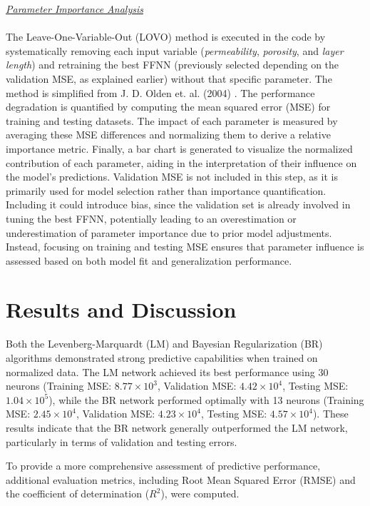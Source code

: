 \documentclass[10pt]{article}
\begin{document}
		\underline{\textit{Parameter Importance Analysis}} \\
		\\
		The Leave-One-Variable-Out (LOVO) method is executed in the code by systematically removing each input variable (\textit{permeability}, \textit{porosity}, and \textit{layer length}) and retraining the best FFNN (previously selected depending on the validation MSE, as explained earlier) without that specific parameter. The method is simplified from J. D. Olden et. al. (2004) \cite{olden2004}. The performance degradation is quantified by computing the mean squared error (MSE) for training and testing datasets. The impact of each parameter is measured by averaging these MSE differences and normalizing them to derive a relative importance metric. Finally, a bar chart is generated to visualize the normalized contribution of each parameter, aiding in the interpretation of their influence on the model's predictions. Validation MSE is not included in this step, as it is primarily used for model selection rather than importance quantification. Including it could introduce bias, since the validation set is already involved in tuning the best FFNN, potentially leading to an overestimation or underestimation of parameter importance due to prior model adjustments. Instead, focusing on training and testing MSE ensures that parameter influence is assessed based on both model fit and generalization performance.
	
	\section{Results and Discussion}
	
	Both the Levenberg-Marquardt (LM) and Bayesian Regularization (BR) algorithms demonstrated strong predictive capabilities when trained on normalized data. The LM network achieved its best performance using 30 neurons (Training MSE: \(8.77 \times 10^3\), Validation MSE: \(4.42 \times 10^4\), Testing MSE: \(1.04 \times 10^5\)), while the BR network performed optimally with 13 neurons (Training MSE: \(2.45 \times 10^4\), Validation MSE: \(4.23 \times 10^4\), Testing MSE: \(4.57 \times 10^4\)). These results indicate that the BR network generally outperformed the LM network, particularly in terms of validation and testing errors.
	
	To provide a more comprehensive assessment of predictive performance, additional evaluation metrics, including Root Mean Squared Error (RMSE) and the coefficient of determination ($R^2$), were computed.
	
\end{document}

